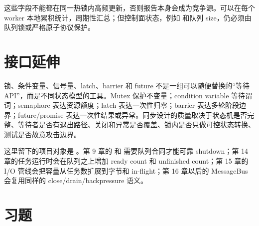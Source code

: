 这些字段不能都在同一热锁内高频更新，否则报告本身会成为竞争源。可以在每个 worker 本地累积统计，周期性汇总；但控制面状态，例如  和队列 size，仍必须由队列锁或严格原子协议保护。

\section{接口延伸}

锁、条件变量、信号量、latch、barrier 和 future 不是一组可以随便替换的“等待 API”，而是不同状态模型的工具。Mutex 保护不变量；condition variable 等待谓词；semaphore 表达资源额度；latch 表达一次性归零；barrier 表达多轮阶段边界；future/promise 表达一次性结果或异常。同步设计的质量取决于状态机是否完整、等待者是否有退出路径、关闭和异常是否覆盖、锁内是否只做可控状态转换、测试是否故意攻击边界。

这里留下的项目对象是 。第 9 章的  和  需要队列合同才能可靠 shutdown；第 14 章的任务运行时会在队列之上增加 ready count 和 unfinished count；第 15 章的 I/O 管线会把容量从任务数扩展到字节和 in-flight；第 16 章以后的 MessageBus 会复用同样的 close/drain/backpressure 语义。

\section{习题}

